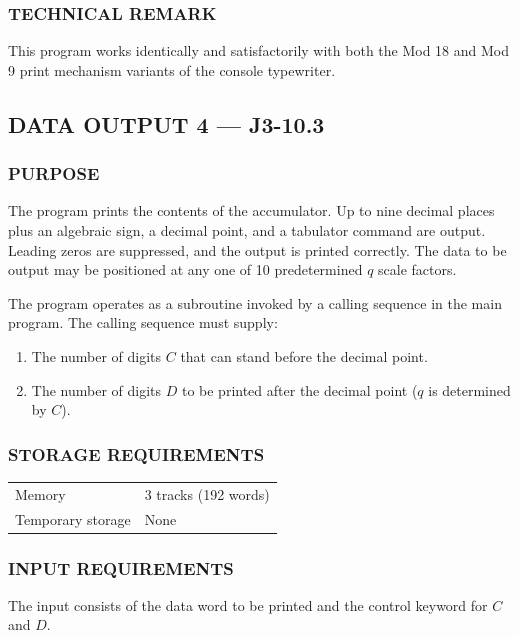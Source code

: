 \subsubsection*{TECHNICAL REMARK}
This program works identically and satisfactorily with both the Mod 18 and Mod 9 print mechanism variants of the console typewriter.
\newpage
\subsection*{DATA OUTPUT 4 --- J3-10.3}
\label{sec:data-output-4}

\subsubsection*{PURPOSE}
The program prints the contents of the accumulator. Up to nine decimal places plus an algebraic sign, a decimal point, and a tabulator command are output. Leading zeros are suppressed, and the output is printed correctly. The data to be output may be positioned at any one of 10 predetermined $q$ scale factors.

The program operates as a subroutine invoked by a calling sequence in the main program. The calling sequence must supply: 
\begin{enumerate}
    \item The number of digits $C$ that can stand before the decimal point.
    \item The number of digits $D$ to be printed after the decimal point ($q$ is determined by $C$).
\end{enumerate}

\subsubsection*{STORAGE REQUIREMENTS}
\begin{center}
\begin{tabular}{ll}
    \toprule
    Memory & 3 tracks (192 words) \\
    Temporary storage    & None \\
    \bottomrule
\end{tabular}
\end{center}

\subsubsection*{INPUT REQUIREMENTS}
The input consists of the data word to be printed and the control keyword for $C$ and $D$.

